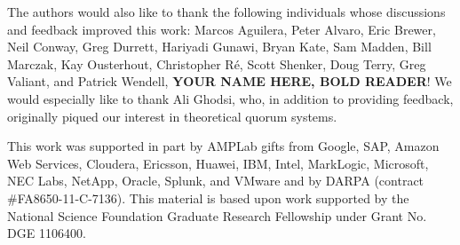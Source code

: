 \documentclass{vldb}
\begin{document}
The authors would also like to thank the following individuals whose
discussions and feedback improved this work: Marcos Aguilera, Peter
Alvaro, Eric Brewer, Neil Conway, Greg Durrett, Hariyadi Gunawi, Bryan
Kate, Sam Madden, Bill Marczak, Kay Ousterhout, Christopher R\'e,
Scott Shenker, Doug Terry, Greg Valiant, and Patrick Wendell,
\textbf{YOUR NAME HERE, BOLD READER}!  We would especially like to thank Ali
Ghodsi, who, in addition to providing feedback, originally piqued our
interest in theoretical quorum systems.

This work was supported in part by AMPLab gifts from Google, SAP,
Amazon Web Services, Cloudera, Ericsson, Huawei, IBM, Intel,
MarkLogic, Microsoft, NEC Labs, NetApp, Oracle, Splunk, and VMware and
by DARPA (contract \#FA8650-11-C-7136).  This material is based upon
work supported by the National Science Foundation Graduate Research
Fellowship under Grant No. DGE 1106400.

\balance

\footnotesize


\end{document}
